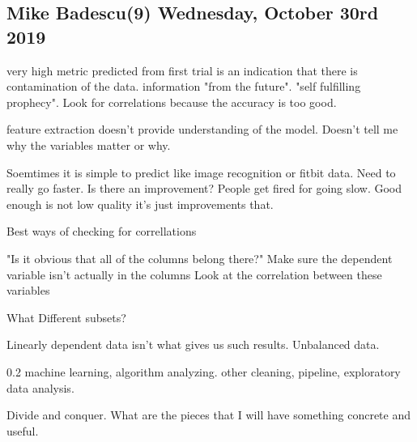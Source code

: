 \subsection{Mike Badescu(9) Wednesday, October 30rd 2019}


very high metric predicted from first trial is
an indication that there is contamination of the
data.
information "from the future". "self fulfilling prophecy".
Look for correlations because the accuracy is too good.

feature extraction doesn't provide understanding of the model.
Doesn't tell me why the variables matter or why.

Soemtimes it is simple to predict like image recognition
or fitbit data.
Need to really go faster. Is there an improvement?
People get fired for going slow.
Good enough is not low quality it's just improvements
that.

Best ways of checking for correllations

"Is it obvious that all of the columns belong there?"
Make sure the dependent variable isn't actually in the columns
Look at the correlation between these variables

What Different subsets?

Linearly dependent data isn't what gives us such results.
Unbalanced data.

0.2 machine learning, algorithm analyzing.
other cleaning, pipeline, exploratory data analysis.

Divide and conquer.
What are the pieces that I will have something concrete
and useful.

